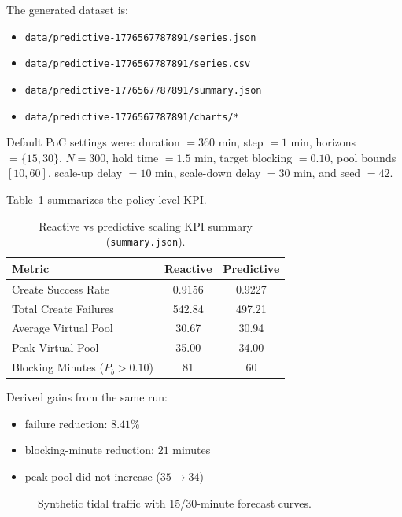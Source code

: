 \documentclass[12pt,a4paper]{report}
\newcommand{\PredictiveChartsDir}{../data/predictive-1776567787891/charts}
\begin{document}
The generated dataset is:
\begin{itemize}
  \item \texttt{data/predictive-1776567787891/series.json}
  \item \texttt{data/predictive-1776567787891/series.csv}
  \item \texttt{data/predictive-1776567787891/summary.json}
  \item \texttt{data/predictive-1776567787891/charts/*}
\end{itemize}

Default PoC settings were: duration \(=360\) min, step \(=1\) min, horizons \(=\{15,30\}\), \(N=300\), hold time \(=1.5\) min, target blocking \(=0.10\), pool bounds \([10,60]\), scale-up delay \(=10\) min, scale-down delay \(=30\) min, and seed \(=42\).

Table~\ref{tab:predictive-summary} summarizes the policy-level KPI.

\begin{table}[H]
\centering
\caption{Reactive vs predictive scaling KPI summary (\texttt{summary.json}).}
\label{tab:predictive-summary}
\begin{tabular}{lcc}
\toprule
Metric & Reactive & Predictive \\
\midrule
Create Success Rate & 0.9156 & 0.9227 \\
Total Create Failures & 542.84 & 497.21 \\
Average Virtual Pool & 30.67 & 30.94 \\
Peak Virtual Pool & 35.00 & 34.00 \\
Blocking Minutes (\(P_b>0.10\)) & 81 & 60 \\
\bottomrule
\end{tabular}
\end{table}

Derived gains from the same run:
\begin{itemize}
  \item failure reduction: \(8.41\%\)
  \item blocking-minute reduction: \(21\) minutes
  \item peak pool did not increase (\(35 \rightarrow 34\))
\end{itemize}

\begin{figure}[H]
\centering

\caption{Synthetic tidal traffic with 15/30-minute forecast curves.}
\label{fig:predictive-traffic-forecast}
\end{figure}
\end{document}
